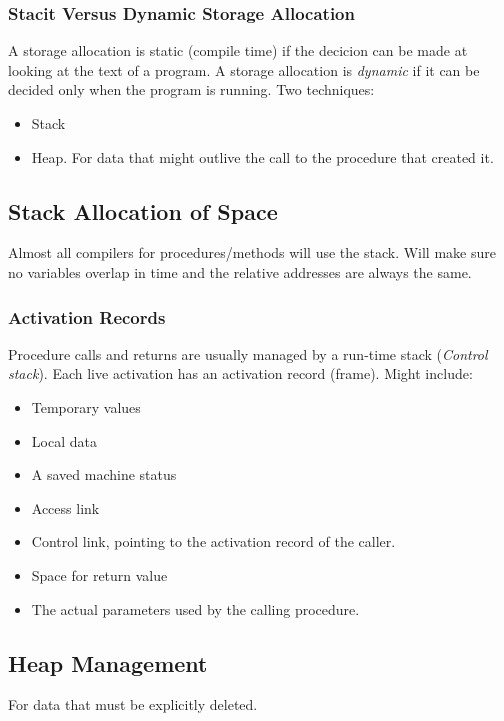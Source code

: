 \documentclass{article}
\begin{document}
\subsubsection{Stacit Versus Dynamic Storage Allocation} %
\label{ssub:Stacit Versus Dynamic Storage Allocation}
A storage allocation is static (compile time) if the decicion can be made at looking at the text of a program. A storage allocation is \emph{dynamic} if it can be decided only when the program is running. Two techniques:
\begin{itemize}
	\item Stack
	\item Heap. For data that might outlive the call to the procedure that created it.
\end{itemize}

\subsection{Stack Allocation of Space} %
\label{sub:Stack Allocation of Space}
Almost all compilers for procedures/methods will use the stack. Will make sure no variables overlap in time and the relative addresses are always the same.

\subsubsection{Activation Records} %
\label{ssub:Activation Records}
Procedure calls and returns are usually managed by a run-time stack (\emph{Control stack}). Each live activation has an activation record (frame). Might include:
\begin{itemize}
	\item Temporary values
	\item Local data
	\item A saved machine status
	\item Access link
	\item Control link, pointing to the activation record of the caller.
	\item Space for return value
	\item The actual parameters used by the calling procedure.
\end{itemize}

\subsection{Heap Management} %
\label{sub:Heap Management}
For data that must be explicitly deleted.
\end{document}
